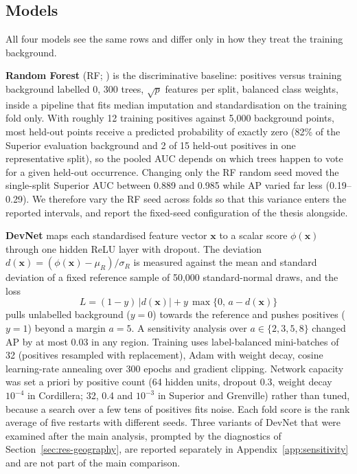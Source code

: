 \documentclass[pdflatex,sn-apa]{sn-jnl}
\begin{document}
\subsection{Models}\label{sec:models}

All four models see the same rows and differ only in how they treat the training background.

\textbf{Random Forest} (RF; \citealp{Breiman2001}) is the discriminative baseline: positives versus training background labelled 0, 300 trees, $\sqrt{p}$ features per split, balanced class weights, inside a pipeline that fits median imputation and standardisation on the training fold only. With roughly 12 training positives against 5,000 background points, most held-out points receive a predicted probability of exactly zero (82\% of the Superior evaluation background and 2 of 15 held-out positives in one representative split), so the pooled AUC depends on which trees happen to vote for a given held-out occurrence. Changing only the RF random seed moved the single-split Superior AUC between 0.889 and 0.985 while AP varied far less (0.19--0.29). We therefore vary the RF seed across folds so that this variance enters the reported intervals, and report the fixed-seed configuration of the thesis alongside.

\textbf{DevNet} \citep{Pang2019} maps each standardised feature vector $\mathbf{x}$ to a scalar score $\phi(\mathbf{x})$ through one hidden ReLU layer with dropout. The deviation $d(\mathbf{x}) = (\phi(\mathbf{x}) - \mu_R)/\sigma_R$ is measured against the mean and standard deviation of a fixed reference sample of 50,000 standard-normal draws, and the loss
\begin{equation}
L = (1-y)\,|d(\mathbf{x})| + y\,\max\{0,\, a - d(\mathbf{x})\}
\end{equation}
pulls unlabelled background ($y=0$) towards the reference and pushes positives ($y=1$) beyond a margin $a = 5$. A sensitivity analysis over $a \in \{2,3,5,8\}$ changed AP by at most 0.03 in any region. Training uses label-balanced mini-batches of 32 (positives resampled with replacement), Adam \citep{Kingma2014} with weight decay, cosine learning-rate annealing over 300 epochs and gradient clipping. Network capacity was set a priori by positive count (64 hidden units, dropout 0.3, weight decay $10^{-4}$ in Cordillera; 32, 0.4 and $10^{-3}$ in Superior and Grenville) rather than tuned, because a search over a few tens of positives fits noise. Each fold score is the rank average of five restarts with different seeds. Three variants of DevNet that were examined after the main analysis, prompted by the diagnostics of Section~\ref{sec:res-geography}, are reported separately in Appendix~\ref{app:sensitivity} and are not part of the main comparison.
\end{document}
